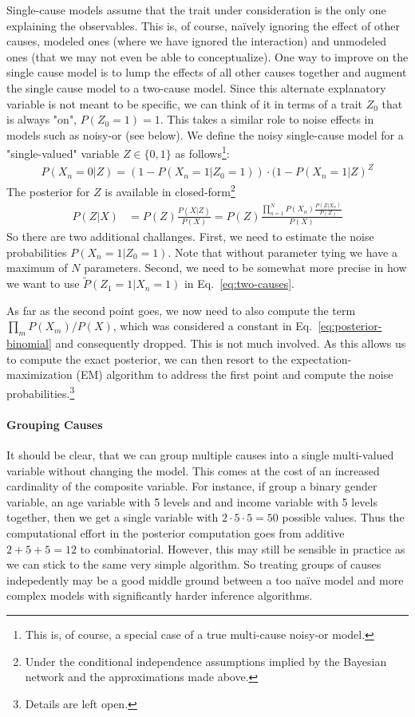 \documentclass{article}
\begin{document}
Single-cause models assume that the trait under consideration is the only one explaining the observables. This is, of course, na\"ively ignoring the effect of other causes, modeled ones (where we have ignored the interaction) and unmodeled ones (that we may not even be able to conceptualize). One way to improve on the single cause model is to lump the effects of all other causes together and augment the single cause model to a two-cause  model. Since this alternate explanatory variable is not meant to be specific, we can think of it in terms of a trait $Z_0$ that is always "on", $P(Z_0=1)=1$. This takes a similar role to noise effects in models such as noisy-or (see below). We define the noisy single-cause model for a "single-valued" variable $Z\in \{0,1\}$ as follows\footnote{This is, of course, a special case of a true multi-cause noisy-or model.}:
\begin{align}
P(X_n=0 | Z) = (1- P(X_n=1 | Z_0=1)) \cdot (1-P(X_n=1|Z)^{Z}
\label{eq:two-causes}
\end{align}
The posterior for $Z$ is available in closed-form\footnote{Under the conditional independence assumptions implied by the Bayesian network and the approximations made above.}
\begin{align}
P(Z | X)  & = P(Z) \frac{P(X | Z)}{P(X)} = P(Z) \frac{\prod_{n=1}^N P(X_n) \frac{P(Z|X_n)}{P(Z)}}{P(X)}
\end{align}
So there are two additional challanges. First, we need to estimate the noise probabilities $P(X_n=1 | Z_0=1)$. Note that without parameter tying we have a maximum of $N$ parameters. Second, we need to be somewhat more precise in how we want to use $\tilde P(Z_1=1| X_n=1)$ in Eq.~\eqref{eq:two-causes}. 

As far as the second point goes, we now need to also compute the term $\prod_m P(X_m) / P(X)$, which was considered a constant in Eq.~\eqref{eq:posterior-binomial} and consequently dropped. This is not much involved.  As this allows us to compute the exact posterior, we can then resort to the expectation-maximization (EM) algorithm to address the first point and compute the noise probabilities.\footnote{Details are left open.}

\paragraph{Grouping Causes}

It should be clear, that we can group multiple causes into a single multi-valued variable without changing the model. This comes at the cost of an increased cardinality of the composite variable. For instance, if group a binary gender variable, an age variable with 5 levels and and income variable with 5 levels together, then we get a single variable with $2\cdot 5 \cdot 5 =50$ possible values. Thus the computational effort in the posterior computation goes from additive $2+5+5=12$ to combinatorial. However, this may still be sensible in practice as we can stick to the same very simple algorithm. So treating groups of causes indepedently may be a good middle ground between a too na\"ive model and more complex models with significantly harder inference algorithms. 
\end{document}
